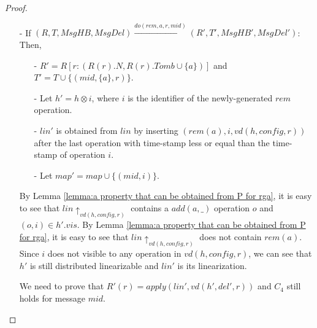 {\begin {proof}
\begin{itemize}
    We already know that $R(r) = \mathit{apply}(\mathit{lin},\mathit{vd}(h,\mathit{del},r))$.

    By Lemma \ref{lemma:a property that can be obtained from P for rga}, it is not hard to see that $C_4$ still holds for message $\mathit{mid}$. From the fact that $\mathit{ts}_a$ is unique, the fact that there is no $\mathit{rem}(a)$ in $h$, the construction of $R'(r)$, Lemma \ref{lemma:a property that can be obtained from P for rga} and $C_4$ holds for message $\mathit{mid}$, we can see that $R'(r) = \mathit{apply}(\mathit{lin}',\mathit{vd}(h',\mathit{del}',r))$.


\item[-] If $(R,T,\mathit{MsgHB},\mathit{MsgDel}) {\xrightarrow{\mathit{do}(\mathit{rem},a,r,\mathit{mid})}} (R',T',\mathit{MsgHB}',\mathit{MsgDel}')$: Then,

    \begin{itemize}
    \setlength{\itemsep}{0.5pt}
    \item[-] $R' = R[ r: (R(r).N,R(r).\mathit{Tomb} \cup \{ a \} ) ]$ and $T' = T \cup \{ (\mathit{mid},\{ a \},r) \}$.

    \item[-] Let $h' = h \otimes i$, where $i$ is the identifier of the newly-generated $\mathit{rem}$ operation.

    \item[-] $\mathit{lin}'$ is obtained from $\mathit{lin}$ by inserting $(\mathit{rem}(a),i,\mathit{vd}(h,\mathit{config},r))$ after the last operation with time-stamp less or equal than the time-stamp of operation $i$.

    \item[-] Let $\mathit{map}' = \mathit{map} \cup \{ (\mathit{mid},i) \}$.
    \end{itemize}

    By Lemma \ref{lemma:a property that can be obtained from P for rga}, it is easy to see that $\mathit{lin} \uparrow_{\mathit{vd}(h,\mathit{config},r)}$ contains a $\mathit{add}(a,\_)$ operation $o$ and $(o,i) \in h'.\mathit{vis}$. By Lemma \ref{lemma:a property that can be obtained from P for rga}, it is easy to see that $\mathit{lin} \uparrow_{\mathit{vd}(h,\mathit{config},r)}$ does not contain $\mathit{rem}(a)$. Since $i$ does not visible to any operation in $\mathit{vd}(h,\mathit{config},r)$, we can see that $h'$ is still distributed linearizable and $\mathit{lin}'$ is its linearization.

    We need to prove that $R'(r) = \mathit{apply}(\mathit{lin}',\mathit{vd}(h',\mathit{del}',r))$ and $C_4$ still holds for message $\mathit{mid}$.


\end{itemize}
\end{proof}}
